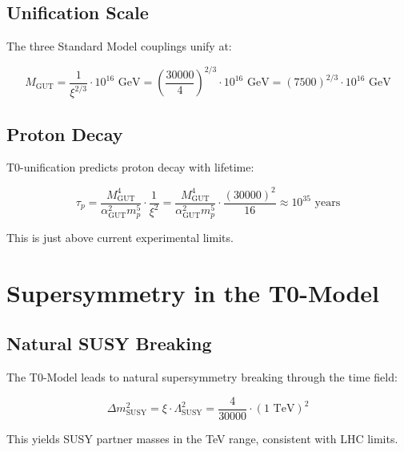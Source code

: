 \documentclass[12pt,a4paper]{report}
\newcommand{\xipar}{\xi}      %
\begin{document}
	\subsection{Unification Scale}\label{subsec:unification_scale}
	
	The three Standard Model couplings unify at:
	
	\begin{equation}\label{eq:unification_scale}
		M_{\text{GUT}} = \frac{1}{\xipar^{2/3}} \cdot 10^{16} \text{ GeV} = \left(\frac{30000}{4}\right)^{2/3} \cdot 10^{16} \text{ GeV} = (7500)^{2/3} \cdot 10^{16} \text{ GeV}
	\end{equation}
	
	\subsection{Proton Decay}\label{subsec:proton_decay}
	
	T0-unification predicts proton decay with lifetime:
	
	\begin{equation}\label{eq:proton_decay}
		\tau_p = \frac{M_{\text{GUT}}^4}{\alpha_{\text{GUT}}^2 m_p^5} \cdot \frac{1}{\xipar^2} = \frac{M_{\text{GUT}}^4}{\alpha_{\text{GUT}}^2 m_p^5} \cdot \frac{(30000)^2}{16} \approx 10^{35} \text{ years}
	\end{equation}
	
	This is just above current experimental limits.
	
	\section{Supersymmetry in the T0-Model}\label{sec:supersymmetry}
	
	\subsection{Natural SUSY Breaking}\label{subsec:natural_susy_breaking}
	
	The T0-Model leads to natural supersymmetry breaking through the time field:
	
	\begin{equation}\label{eq:susy_breaking}
		\Delta m_{\text{SUSY}}^2 = \xipar \cdot \Lambda_{\text{SUSY}}^2 = \frac{4}{30000} \cdot (1 \text{ TeV})^2
	\end{equation}
	
	This yields SUSY partner masses in the TeV range, consistent with LHC limits.
	
\end{document}

